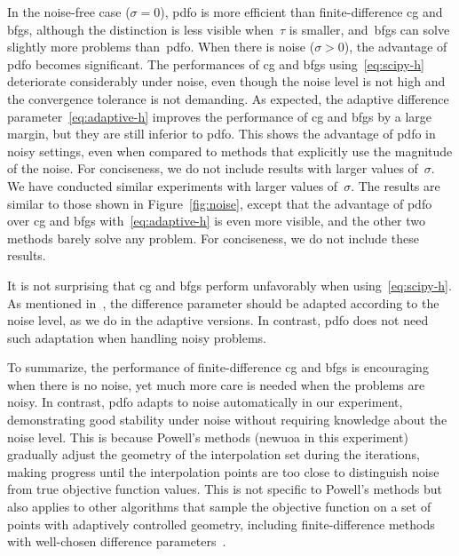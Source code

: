 \documentclass{article}
\numberwithin{equation}{section}
\theoremstyle{definition}
\theoremstyle{plain}
\theoremstyle{remark}
\begin{document}
In the noise-free case ($\sigma = 0$), \gls{pdfo} is more efficient than finite-difference \gls{cg} and \gls{bfgs}, although the distinction is less visible when~$\tau$ is smaller, and~\gls{bfgs} can solve slightly more problems than~\gls{pdfo}.
When there is noise ($\sigma >0$), the advantage of \gls{pdfo} becomes significant.
The performances of \gls{cg} and \gls{bfgs} using~\eqref{eq:scipy-h} deteriorate considerably under noise, even though the noise level is not high and the convergence tolerance is not demanding.
As expected, the adaptive difference parameter~\eqref{eq:adaptive-h} improves the performance of \gls{cg} and \gls{bfgs} by a large margin, but they are still inferior to \gls{pdfo}.
This shows the advantage of \gls{pdfo} in noisy settings, even when compared to methods that explicitly use the magnitude of the noise.
For conciseness, we do not include results with larger values of~$\sigma$.
We have conducted similar experiments with larger values of~$\sigma$.
The results are similar to those shown in Figure~\ref{fig:noise}, except that the advantage of \gls{pdfo} over \gls{cg} and \gls{bfgs} with~\eqref{eq:adaptive-h} is even more visible, and the other two methods barely solve any problem.
For conciseness, we do not include these results.

It is not surprising that \gls{cg} and \gls{bfgs} perform unfavorably when using~\eqref{eq:scipy-h}.
As mentioned in~\cite{More_Wild_2012,Shi_Etal_2022a,Shi_Etal_2023}, the difference parameter should be adapted according to the noise level, as we do in the adaptive versions.
In contrast, \gls{pdfo} does not need such adaptation when handling noisy problems.

To summarize, the performance of finite-difference \gls{cg} and \gls{bfgs} is encouraging when there is no noise, yet much more care is needed when the problems are noisy.
In contrast, \gls{pdfo} adapts to noise automatically in our experiment, demonstrating good stability under noise without requiring knowledge about the noise level.
This is because Powell's methods (\gls{newuoa} in this experiment) gradually adjust the geometry of the interpolation set during the iterations, making progress until the interpolation points are too close to distinguish noise from true objective function values.
This is not specific to Powell's methods but also applies to other algorithms that sample the objective function on a set of points with adaptively controlled geometry, including finite-difference methods with well-chosen difference parameters~\cite{Shi_Etal_2022a}.
\end{document}
